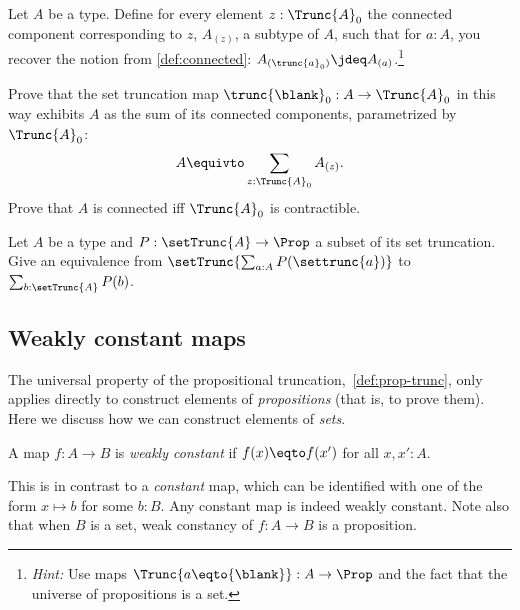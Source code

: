 \begin{xca}\label{xca:sum-of-conn-components}
  Let $A$ be a type. Define for every element $z : \Trunc{A}_0$
  the connected component corresponding to $z$, $A_{(z)}$,
  a subtype of $A$, such that for $a:A$, you recover the notion from
  \cref{def:connected}: $A_{(\trunc{a}_0)} \jdeq A_{(a)}$.\footnote{%
    \emph{Hint:} Use maps $\Trunc{a \eqto {\blank}} : A \to \Prop$
    and the fact that the universe of propositions
    is a set.}

  Prove that the set truncation map $\trunc{\blank}_0 : A \to \Trunc{A}_0$
  in this way exhibits $A$ as the sum of its connected components,
  parametrized by $\Trunc{A}_0$:
  \[
    A \equivto \sum_{z : \Trunc{A}_0} A_{(z)}.
  \]
  Prove that $A$ is connected iff $\Trunc{A}_0$ is contractible.
\end{xca}

\begin{xca}\label{xca:subset-of-set-trunc} 
Let $A$ be a type and $P:\setTrunc{A}\to\Prop$ a subset of
its set truncation. Give an 
equivalence from $\setTrunc{\sum_{a:A}P(\settrunc{a})}$ to
$\sum_{b:\setTrunc{A}}P(b)$.
\end{xca}


\subsection{Weakly constant maps}

The universal property of the propositional truncation,~\cref{def:prop-trunc},
only applies directly to construct elements of \emph{propositions} (that is, to prove them).
Here we discuss how we can construct elements of \emph{sets}.

\begin{definition}
  A map $f: A \to B$ is \emph{weakly constant} if $f(x) \eqto f(x')$ for all $x,x':A$.
\end{definition}
This is in contrast to a \emph{constant} map,
which can be identified with one of the form $x \mapsto b$ for some $b:B$.
Any constant map is indeed weakly constant.
Note also that when $B$ is a set,
weak constancy of $f : A \to B$ is a proposition.

